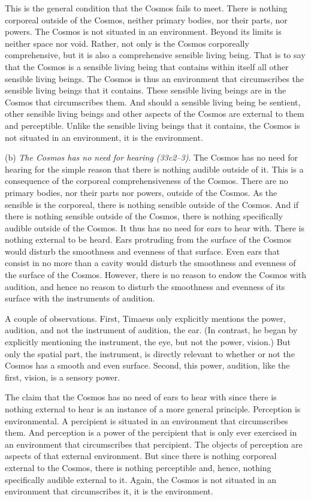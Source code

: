 This is the general condition that the Cosmos fails to meet. There is nothing corporeal outside of the Cosmos, neither primary bodies, nor their parts, nor powers. The Cosmos is not situated in an environment. Beyond its limits is neither space nor void. Rather, not only is the Cosmos corporeally comprehensive, but it is also a comprehensive sensible living being. That is to say that the Cosmos is a sensible living being that contains within itself all other sensible living beings. The Cosmos is thus an environment that circumscribes the sensible living beings that it contains. These sensible living beings are in the Cosmos that circumscribes them. And should a sensible living being be sentient, other sensible living beings and other aspects of the Cosmos are external to them and perceptible. Unlike the sensible living beings that it contains, the Cosmos is not situated in an environment, it is the environment.

(b) \emph{The Cosmos has no need for hearing (33c2–3)}. The Cosmos has no need for hearing for the simple reason that there is nothing audible outside of it. This is a consequence of the corporeal comprehensiveness of the Cosmos. There are no primary bodies, nor their parts nor powers, outside of the Cosmos. As the sensible is the corporeal, there is nothing sensible outside of the Cosmos. And if there is nothing sensible outside of the Cosmos, there is nothing specifically audible outside of the Cosmos. It thus has no need for ears to hear with. There is nothing external to be heard. Ears protruding from the surface of the Cosmos would disturb the smoothness and evenness of that surface. Even ears that consist in no more than a cavity would disturb the smoothness and evenness of the surface of the Cosmos. However, there is no reason to endow the Cosmos with audition, and hence no reason to disturb the smoothness and evenness of its surface with the instruments of audition.

A couple of observations. First, Timaeus only explicitly mentions the power, audition, and not the instrument of audition, the ear. (In contrast, he began by explicitly mentioning the instrument, the eye, but not the power, vision.) But only the spatial part, the instrument, is directly relevant to whether or not the Cosmos has a smooth and even surface. Second, this power, audition, like the first, vision, is a sensory power.

The claim that the Cosmos has no need of ears to hear with since there is nothing external to hear is an instance of a more general principle. Perception is environmental. A percipient is situated in an environment that circumscribes them. And perception is a power of the percipient that is only ever exercised in an environment that circumscribes that percipient. The objects of perception are aspects of that external environment. But since there is nothing corporeal external to the Cosmos, there is nothing perceptible and, hence, nothing specifically audible external to it. Again, the Cosmos is not situated in an environment that circumscribes it, it is the environment.

